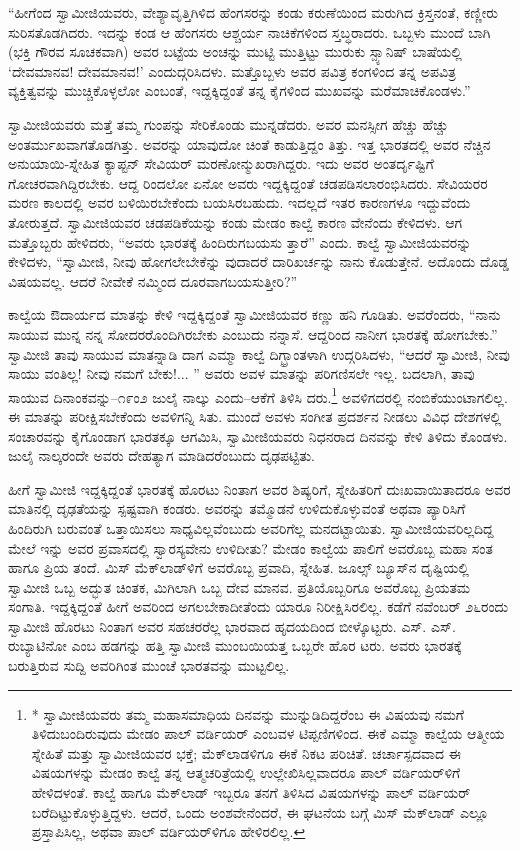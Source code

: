 “ಹೀಗೆಂದ ಸ್ವಾಮೀಜಿಯವರು, ವೇಶ್ಯಾವೃತ್ತಿಗಿಳಿದ ಹೆಂಗಸರನ್ನು ಕಂಡು ಕರುಣೆಯಿಂದ ಮರುಗಿದ ಕ್ರಿಸ್ತನಂತೆ, ಕಣ್ಣೀರು ಸುರಿಸತೊಡಗಿದರು. ಇದನ್ನು ಕಂಡ ಆ ಹೆಂಗಸರು ಆಶ್ಚರ್ಯ ನಾಚಿಕೆಗಳಿಂದ ಸ್ತಬ್ಧರಾದರು. ಒಬ್ಬಳು ಮುಂದೆ ಬಾಗಿ (ಭಕ್ತಿ ಗೌರವ ಸೂಚಕವಾಗಿ) ಅವರ ಬಟ್ಟೆಯ ಅಂಚನ್ನು ಮುಟ್ಟಿ ಮುತ್ತಿಟ್ಟು ಮುರುಕು ಸ್ಪ್ಯಾನಿಷ್ ಬಾಷೆಯಲ್ಲಿ ‘ದೇವಮಾನವ! ದೇವಮಾನವ!’ ಎಂದುದ್ಗರಿಸಿದಳು. ಮತ್ತೊಬ್ಬಳು ಅವರ ಪವಿತ್ರ ಕಂಗಳಿಂದ ತನ್ನ ಅಪವಿತ್ರ ವ್ಯಕ್ತಿತ್ವವನ್ನು ಮುಚ್ಚಿಕೊಳ್ಳಲೋ ಎಂಬಂತೆ, ಇದ್ದಕ್ಕಿದ್ದಂತೆ ತನ್ನ ಕೈಗಳಿಂದ ಮುಖವನ್ನು ಮರೆಮಾಚಿಕೊಂಡಳು.”

ಸ್ವಾಮೀಜಿಯವರು ಮತ್ತೆ ತಮ್ಮ ಗುಂಪನ್ನು ಸೇರಿಕೊಂಡು ಮುನ್ನಡೆದರು. ಅವರ ಮನಸ್ಸೀಗ ಹೆಚ್ಚು ಹೆಚ್ಚು ಅಂತರ್ಮುಖವಾಗತೊಡಗಿತ್ತು. ಅವರನ್ನು ಯಾವುದೋ ಚಿಂತೆ ಕಾಡುತ್ತಿದ್ದಂ ತಿತ್ತು. ಇತ್ತ ಭಾರತದಲ್ಲಿ ಅವರ ನೆಚ್ಚಿನ ಅನುಯಾಯಿ-ಸ್ನೇಹಿತ ಕ್ಯಾಪ್ಟನ್ ಸೇವಿಯರ್ ಮರಣೋನ್ಮುಖರಾಗಿದ್ದರು. ಇದು ಅವರ ಅಂತರ್ದೃಷ್ಟಿಗೆ ಗೋಚರವಾಗಿದ್ದಿರಬೇಕು. ಆದ್ದ ರಿಂದಲೋ ಏನೋ ಅವರು ಇದ್ದಕ್ಕಿದ್ದಂತೆ ಚಡಪಡಿಸಲಾರಂಭಿಸಿದರು. ಸೇವಿಯರರ ಮರಣ ಕಾಲದಲ್ಲಿ ಅವರ ಬಳಿಯಿರಬೇಕೆಂದು ಬಯಸಿರಬಹುದು. ಇದಲ್ಲದೆ ಇತರ ಕಾರಣಗಳೂ ಇದ್ದುವೆಂದು ತೋರುತ್ತದೆ. ಸ್ವಾಮೀಜಿಯವರ ಚಡಪಡಿಕೆಯನ್ನು ಕಂಡು ಮೇಡಂ ಕಾಲ್ವೆ ಕಾರಣ ವೇನೆಂದು ಕೇಳಿದಳು. ಆಗ ಮತ್ತೊಬ್ಬರು ಹೇಳಿದರು, “ಅವರು ಭಾರತಕ್ಕೆ ಹಿಂದಿರುಗಬಯಸು ತ್ತಾರೆ” ಎಂದು. ಕಾಲ್ವೆ ಸ್ವಾಮೀಜಿಯವರನ್ನು ಕೇಳಿದಳು, “ಸ್ವಾಮೀಜಿ, ನೀವು ಹೋಗಲೇಬೇಕೆನ್ನು ವುದಾದರೆ ದಾರಿಖರ್ಚನ್ನು ನಾನು ಕೊಡುತ್ತೇನೆ. ಅದೊಂದು ದೊಡ್ಡ ವಿಷಯವಲ್ಲ. ಆದರೆ ನೀವೇಕೆ ನಮ್ಮಿಂದ ದೂರವಾಗಬಯಸುತ್ತೀರಿ?”

ಕಾಲ್ವೆಯ ಔದಾರ್ಯದ ಮಾತನ್ನು ಕೇಳಿ ಇದ್ದಕ್ಕಿದ್ದಂತೆ ಸ್ವಾಮೀಜಿಯವರ ಕಣ್ಣು ಹನಿ ಗೂಡಿತು. ಅವರೆಂದರು, “ನಾನು ಸಾಯುವ ಮುನ್ನ ನನ್ನ ಸೋದರರೊಂದಿಗಿರಬೇಕು ಎಂಬುದು ನನ್ನಾಸೆ. ಆದ್ದರಿಂದ ನಾನೀಗ ಭಾರತಕ್ಕೆ ಹೋಗಬೇಕು.” ಸ್ವಾಮೀಜಿ ತಾವು ಸಾಯುವ ಮಾತನ್ನಾಡಿ ದಾಗ ಎಮ್ಮಾ ಕಾಲ್ವೆ ದಿಗ್ಭ್ರಾಂತಳಾಗಿ ಉದ್ಗರಿಸಿದಳು, “ಆದರೆ ಸ್ವಾಮೀಜಿ, ನೀವು ಸಾಯು ವಂತಿಲ್ಲ! ನೀವು ನಮಗೆ ಬೇಕು!... ” ಅವರು ಅವಳ ಮಾತನ್ನು ಪರಿಗಣಿಸಲೇ ಇಲ್ಲ. ಬದಲಾಗಿ, ತಾವು ಸಾಯುವ ದಿನಾಂಕವನ್ನು–೧೯ಂ೨ ಜುಲೈ ನಾಲ್ಕು ಎಂದು–ಆಕೆಗೆ ತಿಳಿಸಿ ದರು.\footnote{* ಸ್ವಾಮೀಜಿಯವರು ತಮ್ಮ ಮಹಾಸಮಾಧಿಯ ದಿನವನ್ನು ಮುನ್ನುಡಿದಿದ್ದರೆಂಬ ಈ ವಿಷಯವು ನಮಗೆ ತಿಳಿದುಬಂದಿರುವುದು ಮೇಡಂ ಪಾಲ್ ವರ್ಡಿಯರ್ ಎಂಬವಳ ಟಿಪ್ಪಣಿಗಳಿಂದ. ಈಕೆ ಎಮ್ಮಾ ಕಾಲ್ವೆಯ ಆತ್ಮೀಯ ಸ್ನೇಹಿತೆ ಮತ್ತು ಸ್ವಾಮೀಜಿಯವರ ಭಕ್ತೆ; ಮೆಕ್​ಲಾಡಳಿಗೂ ಈಕೆ ನಿಕಟ ಪರಿಚಿತೆ. ಚರ್ಚಾಸ್ಪದವಾದ ಈ ವಿಷಯಗಳನ್ನು ಮೇಡಂ ಕಾಲ್ವೆ ತನ್ನ ಆತ್ಮಚರಿತ್ರೆಯಲ್ಲಿ ಉಲ್ಲೇಖಿಸಿಲ್ಲವಾದರೂ ಪಾಲ್ ವರ್ಡಿಯರ್​ಳಿಗೆ ಹೇಳಿದಳಂತೆ. ಕಾಲ್ವೆ ಹಾಗೂ ಮೆಕ್​ಲಾಡ್ ಇಬ್ಬರೂ ತನಗೆ ತಿಳಿಸಿದ ವಿಷಯಗಳನ್ನು ಪಾಲ್ ವರ್ಡಿಯರ್ ಬರೆದಿಟ್ಟುಕೊಳ್ಳುತ್ತಿದ್ದಳು. ಆದರೆ, ಒಂದು ಅಂಶವೇನೆಂದರೆ, ಈ ಘಟನೆಯ ಬಗ್ಗೆ ಮಿಸ್ ಮೆಕ್​ಲಾಡ್ ಎಲ್ಲೂ ಪ್ರಸ್ತಾಪಿಸಿಲ್ಲ, ಅಥವಾ ಪಾಲ್ ವರ್ಡಿಯರ್​ಳಿಗೂ ಹೇಳಿರಲಿಲ್ಲ.} ಅವಳಿಗದರಲ್ಲಿ ನಂಬಿಕೆಯುಂಟಾಗಲಿಲ್ಲ. ಈ ಮಾತನ್ನು ಪರೀಕ್ಷಿಸಬೇಕೆಂದು ಅವಳಿಗನ್ನಿ ಸಿತು. ಮುಂದೆ ಅವಳು ಸಂಗೀತ ಪ್ರದರ್ಶನ ನೀಡಲು ವಿವಿಧ ದೇಶಗಳಲ್ಲಿ ಸಂಚಾರವನ್ನು ಕೈಗೊಂಡಾಗ ಭಾರತಕ್ಕೂ ಆಗಮಿಸಿ, ಸ್ವಾಮೀಜಿಯವರು ನಿಧನರಾದ ದಿನವನ್ನು ಕೇಳಿ ತಿಳಿದು ಕೊಂಡಳು. ಜುಲೈ ನಾಲ್ಕರಂದೇ ಅವರು ದೇಹತ್ಯಾಗ ಮಾಡಿದರೆಂಬುದು ದೃಢಪಟ್ಟಿತು.

ಹೀಗೆ ಸ್ವಾಮೀಜಿ ಇದ್ದಕ್ಕಿದ್ದಂತೆ ಭಾರತಕ್ಕೆ ಹೊರಟು ನಿಂತಾಗ ಅವರ ಶಿಷ್ಯರಿಗೆ, ಸ್ನೇಹಿತರಿಗೆ ದುಃಖವಾಯಿತಾದರೂ ಅವರ ಮಾತಿನಲ್ಲಿ ದೃಢತೆಯನ್ನು ಸ್ಪಷ್ಟವಾಗಿ ಕಂಡರು. ಅವರನ್ನು ತಮ್ಮೊಡನೆ ಉಳಿದುಕೊಳ್ಳುವಂತೆ ಅಥವಾ ಪ್ಯಾರಿಸಿಗೆ ಹಿಂದಿರುಗಿ ಬರುವಂತೆ ಒತ್ತಾಯಿಸಲು ಸಾಧ್ಯವಿಲ್ಲವೆಂಬುದು ಅವರಿಗೆಲ್ಲ ಮನದಟ್ಟಾಯಿತು. ಸ್ವಾಮೀಜಿಯವರಿಲ್ಲದಿದ್ದ ಮೇಲೆ ಇನ್ನು ಅವರ ಪ್ರವಾಸದಲ್ಲಿ ಸ್ವಾರಸ್ಯವೇನು ಉಳಿದೀತು? ಮೇಡಂ ಕಾಲ್ವೆಯ ಪಾಲಿಗೆ ಅವರೊಬ್ಬ ಮಹಾ ಸಂತ ಹಾಗೂ ಪ್ರಿಯ ತಂದೆ. ಮಿಸ್ ಮೆಕ್​ಲಾಡ್​ಳಿಗೆ ಅವರೊಬ್ಬ ಪ್ರವಾದಿ, ಸ್ನೇಹಿತ. ಜೂಲ್ಸ್ ಬ್ಯೂಸ್​ನ ದೃಷ್ಟಿಯಲ್ಲಿ ಸ್ವಾಮೀಜಿ ಒಬ್ಬ ಅದ್ಭುತ ಚಿಂತಕ, ಮಿಗಿಲಾಗಿ ಒಬ್ಬ ದೇವ ಮಾನವ. ಪ್ರತಿಯೊಬ್ಬರಿಗೂ ಅವರೊಬ್ಬ ಪ್ರಿಯತಮ ಸಂಗಾತಿ. ಇದ್ದಕ್ಕಿದ್ದಂತೆ ಹೀಗೆ ಅವರಿಂದ ಅಗಲಬೇಕಾದೀತೆಂದು ಯಾರೂ ನಿರೀಕ್ಷಿಸಿರಲಿಲ್ಲ. ಕಡೆಗೆ ನವೆಂಬರ್ ೨೬ರಂದು ಸ್ವಾಮೀಜಿ ಹೊರಟು ನಿಂತಾಗ ಅವರ ಸಹಚರರೆಲ್ಲ ಭಾರವಾದ ಹೃದಯದಿಂದ ಬೀಳ್ಕೊಟ್ಟರು. ಎಸ್. ಎಸ್. ರುಬ್ಯಾಟಿನೋ ಎಂಬ ಹಡಗನ್ನು ಹತ್ತಿ ಸ್ವಾಮೀಜಿ ಮುಂಬಯಿಯತ್ತ ಒಬ್ಬರೇ ಹೊರ ಟರು. ಅವರು ಭಾರತಕ್ಕೆ ಬರುತ್ತಿರುವ ಸುದ್ದಿ ಅವರಿಗಿಂತ ಮುಂಚೆ ಭಾರತವನ್ನು ಮುಟ್ಟಲಿಲ್ಲ.

